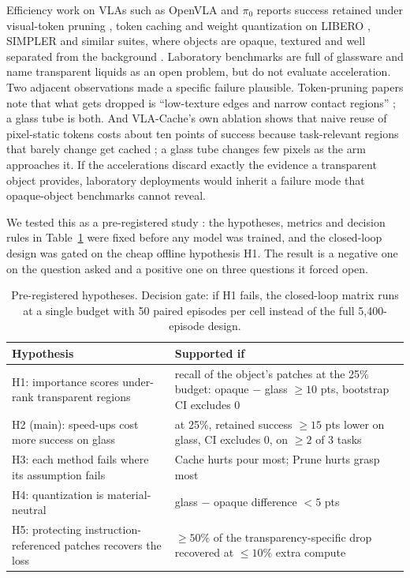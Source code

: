 \documentclass[11pt]{article}
\begin{document}
Efficiency work on VLAs such as OpenVLA and $\pi_0$ \citep{kim2024openvla,black2025pi0} reports success retained under visual-token pruning \citep{liu2025vlapruner,cheng2026vlaiap,yang2025efficientvla}, token caching \citep{xu2025vlacache,wei2026learnedcache} and weight quantization \citep{zhang2026quantvla,wang2026holoq,akbari2026actquant,yan2026hbvla} on LIBERO \citep{liu2023libero}, SIMPLER \citep{li2024simpler} and similar suites, where objects are opaque, textured and well separated from the background \citep{yu2025survey}. Laboratory benchmarks \citep{lan2025autobio,li2025labutopia,ren2026labvla} are full of glassware and name transparent liquids as an open problem, but do not evaluate acceleration. Two adjacent observations made a specific failure plausible. Token-pruning papers note that what gets dropped is ``low-texture edges and narrow contact regions'' \citep{cheng2026vlaiap}; a glass tube is both. And VLA-Cache's own ablation shows that naive reuse of pixel-static tokens costs about ten points of success because task-relevant regions that barely change get cached \citep{xu2025vlacache}; a glass tube changes few pixels as the arm approaches it. If the accelerations discard exactly the evidence a transparent object provides, laboratory deployments would inherit a failure mode that opaque-object benchmarks cannot reveal.

We tested this as a pre-registered study \citep{nosek2018preregistration}: the hypotheses, metrics and decision rules in Table~\ref{tab:hypotheses} were fixed before any model was trained, and the closed-loop design was gated on the cheap offline hypothesis H1. The result is a negative one on the question asked and a positive one on three questions it forced open.

\begin{table}[t]
\centering
\small
\begin{tabular}{>{\raggedright\arraybackslash}p{}>{\raggedright\arraybackslash}p{}}
\toprule
Hypothesis & Supported if \\
\midrule
H1: importance scores under-rank transparent regions & recall of the object's patches at the 25\% budget: opaque $-$ glass $\geq 10$ pts, bootstrap CI excludes 0 \\
H2 (main): speed-ups cost more success on glass & at 25\%, retained success $\geq 15$ pts lower on glass, CI excludes 0, on $\geq 2$ of 3 tasks \\
H3: each method fails where its assumption fails & Cache hurts pour most; Prune hurts grasp most \\
H4: quantization is material-neutral & glass $-$ opaque difference $< 5$ pts \\
H5: protecting instruction-referenced patches recovers the loss & $\geq 50\%$ of the transparency-specific drop recovered at $\leq 10\%$ extra compute \\
\bottomrule
\end{tabular}
\caption{Pre-registered hypotheses. Decision gate: if H1 fails, the closed-loop matrix runs at a single budget with 50 paired episodes per cell instead of the full 5,400-episode design.}
\label{tab:hypotheses}
\end{table}
\end{document}
